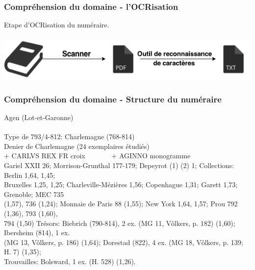 \documentclass[10pt, compress]{beamer}
\begin{document}
\begin{frame}[fragile]
	\frametitle{Compréhension du domaine - l'OCRisation}
	\begin{center}
	Etape d'OCRisation du numéraire.\\~\\
	\includegraphics[scale=.4]{img/ocr.png} 
	\end{center}
\end{frame}
\begin{frame}[fragile]
\frametitle{Compréhension du domaine - Structure du numéraire}
\begin{scriptsize}
Agen (Lot-et-Garonne)\\~\\

Type de 793/4-812: Charlemagne (768-814)\\
Denier de Charlemagne (24 exemplaires étudiés)\\
+ CARLVS REX FR croix~~~~~~~ + AGINNO monogramme\\
Gariel XXII 26; Morrison-Grunthal 177-179; Depeyrot (1) (2) 1; Collections: Berlin 1,64, 1,45;\\
Bruxelles 1,25, 1,25; Charleville-Mézières 1,56; Copenhague 1,31; Garett 1,73; Grenoble; MEC 735 \\
(1,57), 736 (1,24); Monnaie de Paris 88 (1,55); New York 1,64, 1,57; Prou 792 (1,36), 793 (1,60), \\
794 (1,50) Trésors: Biebrich (790-814), 2 ex. (MG 11, Vôlkers, p. 182) (1,60); Ibersheim (814), 1 ex. \\
(MG 13, Vôlkers, p. 186) (1,64); Dorestad (822), 4 ex. (MG 18, Vôlkers, p. 139; H. 7) (1,35);\\
Trouvailles: Bolsward, 1 ex. (H. 528) (1,26).
\end{scriptsize}
\end{frame}
\end{document}
